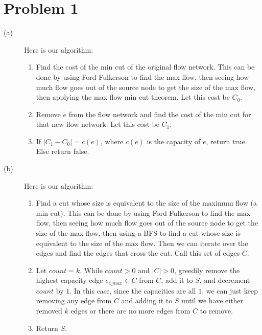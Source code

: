 \documentclass{article}
\begin{document}
\section*{Problem 1}
\begin{description}
    \item[(a)] Here is our algorithm:
        \begin{enumerate}
            \item Find the cost of the min cut of the original flow network.
                This can be done by using Ford Fulkerson to find the max
                flow, then seeing how much flow goes out of the source
                node to get the size of the max flow, then applying the max
                flow min cut theorem. Let this cost be $C_0$.
            \item Remove $e$ from the flow network and find the cost of the min
                cut for that new flow network. Let this cost be $C_1$.
            \item If $|C_1 - C_0| = c(e)$, where $c(e)$ is the capacity of $e$,
                return true. Else return false.
        \end{enumerate}
    \item[(b)] Here is our algorithm:
        \begin{enumerate}
            \item Find a cut whose size is equivalent to the size of the
                maximum flow (a min cut). This can be done by using Ford
                Fulkerson to find the max flow, then seeing how much flow
                goes out of the source node to get the size of the max flow,
                then using a BFS to find a cut whose size is equivalent
                to the size of the max flow. Then we can iterate over the
                edges and find the edges that cross the cut. Call this set of
                edges $C$.
            \item Let $count = k$. While $count > 0$ and $|C| > 0$,
                greedily remove the highest capacity edge $e_{c\_max} \in C$
                from $C$, add it to $S$, and decrement $count$ by $1$. In
                this case, since the capacities are all $1$, we can just keep
                removing any edge from $C$ and adding it to $S$ until we have
                either removed $k$ edges or there are no more edges from $C$
                to remove.
            \item Return $S$.
        \end{enumerate}
\end{description}
\end{document}
